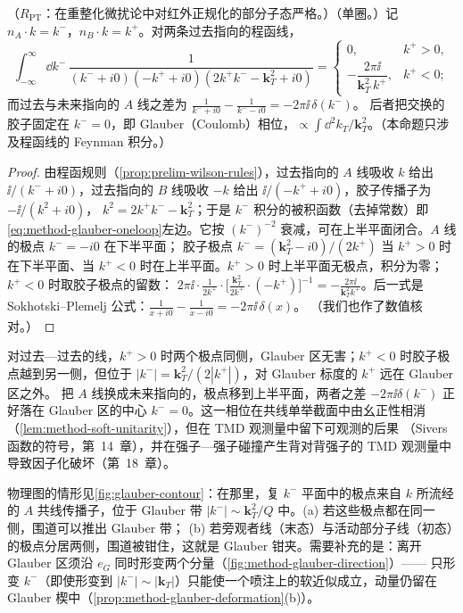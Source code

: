 \begin{proposition}\label{prop:method-glauber-oneloop}
（$R_{\mathrm{PT}}$：在重整化微扰论中对红外正规化的部分子态严格。）（单圈。）记 $n_A\cdot k=k^-$，$n_B\cdot k=k^+$。对两条过去指向的程函线，
\begin{equation}\label{eq:method-glauber-oneloop}
\int_{-\infty}^{\infty}\!\dd k^-\,\frac{1}{(k^-+i0)(-k^++i0)(2k^+k^--\mathbf k_T^2+i0)}=
\begin{cases}0,&k^+>0,\\[2pt]-\dfrac{2\pi\ii}{\mathbf k_T^2\,k^+},&k^+<0;\end{cases}
\end{equation}
而过去与未来指向的 $A$ 线之差为 $\frac1{k^-+i0}-\frac1{k^--i0}=-2\pi\ii\,\delta(k^-)$。
后者把交换的胶子固定在 $k^-=0$，即 Glauber（Coulomb）相位，$\propto\int\dd^2k_T/\mathbf k_T^2$。（本命题只涉及程函线的 Feynman 积分。）
\end{proposition}

\begin{proof}
由程函规则（\cref{prop:prelim-wilson-rules}），过去指向的 $A$ 线吸收 $k$ 给出 $\ii/(k^-+i0)$，过去指向的 $B$ 线吸收 $-k$ 给出 $\ii/(-k^++i0)$，胶子传播子为 $-\ii/(k^2+i0)$，
$k^2=2k^+k^--\mathbf k_T^2$；于是 $k^-$ 积分的被积函数（去掉常数）即\cref{eq:method-glauber-oneloop}左边。它按 $(k^-)^{-2}$ 衰减，可在上半平面闭合。$A$ 线的极点 $k^-=-i0$ 在下半平面；
胶子极点 $k^-=(\mathbf k_T^2-i0)/(2k^+)$ 当 $k^+>0$ 时在下半平面、当 $k^+<0$ 时在上半平面。$k^+>0$ 时上半平面无极点，积分为零；$k^+<0$ 时取胶子极点的留数：
$2\pi\ii\cdot\frac1{2k^+}\cdot\bigl[\frac{\mathbf k_T^2}{2k^+}\cdot(-k^+)\bigr]^{-1}=-\frac{2\pi\ii}{\mathbf k_T^2k^+}$。后一式是 Sokhotski--Plemelj 公式：$\frac1{x+i0}-\frac1{x-i0}=-2\pi\ii\,\delta(x)$。
（我们也作了数值核对。）%
\end{proof}

\begin{example}[单胶子交换的极点图]\label{ex:method-glauber-oneloop}
对过去—过去的线，$k^+>0$ 时两个极点同侧，Glauber 区无害；$k^+<0$ 时胶子极点越到另一侧，但位于 $|k^-|=\mathbf k_T^2/(2|k^+|)$，对 Glauber 标度的 $k^+$ 远在 Glauber 区之外。
把 $A$ 线换成未来指向的，极点移到上半平面，两者之差 $-2\pi\ii\delta(k^-)$ 正好落在 Glauber 区的中心 $k^-=0$。这一相位在共线单举截面中由幺正性相消（\cref{lem:method-soft-unitarity}），但在 TMD 观测量中留下可观测的后果
（Sivers 函数的符号，第~14~章），并在强子—强子碰撞产生背对背强子的 TMD 观测量中导致因子化破坏（第~18~章）。

物理图的情形见\cref{fig:glauber-contour}：在那里，复 $k^-$ 平面中的极点来自 $k$ 所流经的 $A$ 共线传播子，位于 Glauber 带 $|k^-|\sim\mathbf k_T^2/Q$ 中。(a) 若这些极点都在同一侧，围道可以推出 Glauber 带；
(b) 若旁观者线（末态）与活动部分子线（初态）的极点分居两侧，围道被钳住，这就是 Glauber 钳夹。需要补充的是：离开 Glauber 区须沿 $e_G$ 同时形变两个分量（\cref{fig:method-glauber-direction}）——
只形变 $k^-$（即使形变到 $|k^-|\sim|\mathbf k_T|$）只能使一个喷注上的软近似成立，动量仍留在 Glauber 楔中（\cref{prop:method-glauber-deformation}(b)）。
\end{example}

